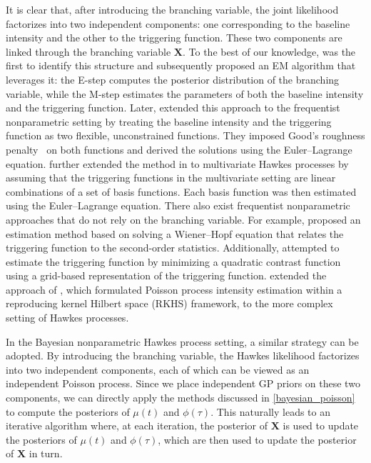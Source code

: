 \documentclass[10pt]{article} %
\begin{document}
It is clear that, after introducing the branching variable, the joint likelihood factorizes into two independent components: one corresponding to the baseline intensity and the other to the triggering function. These two components are linked through the branching variable $\mathbf{X}$. To the best of our knowledge, \citet{marsan2008extending} was the first to identify this structure and subsequently proposed an EM algorithm that leverages it: the E-step computes the posterior distribution of the branching variable, while the M-step estimates the parameters of both the baseline intensity and the triggering function. 
Later, \citet{lewis2011nonparametric} extended this approach to the frequentist nonparametric setting by treating the baseline intensity and the triggering function as two flexible, unconstrained functions. They imposed Good’s roughness penalty~\citep{goodd1971nonparametric} on both functions and derived the solutions using the Euler–Lagrange equation. 
\citet{zhou2013learning} further extended the method in \citet{lewis2011nonparametric} to multivariate Hawkes processes by assuming that the triggering functions in the multivariate setting are linear combinations of a set of basis functions. Each basis function was then estimated using the Euler–Lagrange equation. 
There also exist frequentist nonparametric approaches that do not rely on the branching variable. For example, \citet{bacry2016first} proposed an estimation method based on solving a Wiener–Hopf equation that relates the triggering function to the second-order statistics. Additionally, \citet{eichler2017graphical,reynaud2010adaptive} attempted to estimate the triggering function by minimizing a quadratic contrast function using a grid-based representation of the triggering function. 
\citet{bonnet2024nonparametric} extended the approach of \citet{flaxman2017poisson}, which formulated Poisson process intensity estimation within a reproducing kernel Hilbert space (RKHS) framework, to the more complex setting of Hawkes processes. 


In the Bayesian nonparametric Hawkes process setting, a similar strategy can be adopted. By introducing the branching variable, the Hawkes likelihood factorizes into two independent components, each of which can be viewed as an independent Poisson process. Since we place independent GP priors on these two components, we can directly apply the methods discussed in \cref{bayesian_poisson} to compute the posteriors of $\mu(t)$ and $\phi(\tau)$. This naturally leads to an iterative algorithm where, at each iteration, the posterior of $\mathbf{X}$ is used to update the posteriors of $\mu(t)$ and $\phi(\tau)$, which are then used to update the posterior of $\mathbf{X}$ in turn. 
\end{document}
